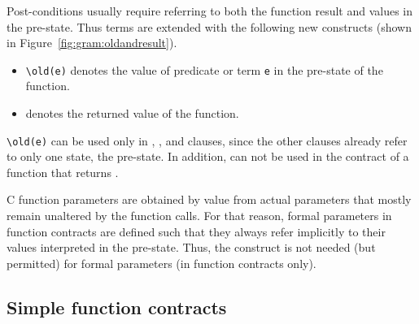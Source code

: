 Post-conditions usually require referring to both the function result and
values in the pre-state. Thus terms are extended with the following new
constructs (shown in Figure~\ref{fig:gram:oldandresult}).
\begin{itemize}
\item \lstinline|\old(e)| denotes the value of
  predicate or term \lstinline|e| in the pre-state of the function.
\item \result{} denotes the returned value of the function.
\end{itemize}
\lstinline|\old(e)| can be used only in \ensures{}, \assigns{},
\allocates{} and \frees{} clauses, since
the other clauses already refer to only one state, the pre-state.
In addition, \result{} can not be used in the contract of a function that returns
\void{}.



C function parameters are obtained by
value from actual parameters that mostly remain unaltered by the
function calls. For that reason, formal parameters in function
contracts are defined such that they always refer implicitly to their
values interpreted in the pre-state.
Thus, the \old construct is not needed (but permitted) for formal parameters (in
function contracts only).

\subsection{Simple function contracts}
\label{sec:simplecontracts}

